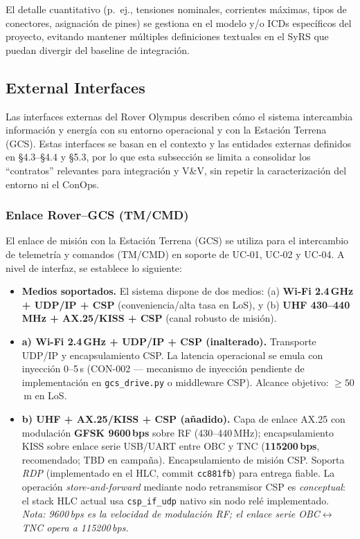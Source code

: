 El detalle cuantitativo (p.\ ej., tensiones nominales, corrientes máximas, tipos de conectores, asignación de pines) se gestiona en el modelo y/o ICDs específicos del proyecto, evitando mantener múltiples definiciones textuales en el SyRS que puedan divergir del baseline de integración.

\subsection{External Interfaces}\label{subsec:external_interfaces}

Las interfaces externas del Rover Olympus describen cómo el sistema intercambia información y energía con su entorno operacional y con la Estación Terrena (GCS). Estas interfaces se basan en el contexto y las entidades externas definidos en §4.3--§4.4 y §5.3, por lo que esta subsección se limita a consolidar los ``contratos'' relevantes para integración y V\&V, sin repetir la caracterización del entorno ni el ConOps.

\subsubsection{Enlace Rover--GCS (TM/CMD)}

El enlace de misión con la Estación Terrena (GCS) se utiliza para el intercambio de telemetría y comandos (TM/CMD) en soporte de UC‑01, UC‑02 y UC‑04. A nivel de interfaz, se establece lo siguiente:

\begin{itemize}
    \item \textbf{Medios soportados.} El sistema dispone de dos medios:
    (a) \textbf{Wi‑Fi 2.4\,GHz + UDP/IP + CSP} (conveniencia/alta tasa en LoS), y
    (b) \textbf{UHF 430–440\,MHz + AX.25/KISS + CSP} (canal robusto de misión).

    \item \textbf{a) Wi-Fi 2.4\,GHz + UDP/IP + CSP (inalterado).}
    Transporte UDP/IP y encapsulamiento CSP. La latencia operacional se emula con
    inyección 0--5\,s (CON-002 --- mecanismo de inyección pendiente de implementación en \texttt{gcs\_drive.py} o middleware CSP). Alcance objetivo: $\ge 50$\,m en LoS.

    \item \textbf{b) UHF + AX.25/\allowbreak KISS + CSP (añadido).}
    Capa de enlace AX.25 con modulación \textbf{GFSK 9600\,bps} sobre RF (430–440\,MHz);
    encapsulamiento KISS sobre enlace serie USB/\allowbreak UART entre OBC y TNC
    (\textbf{115200\,bps}, recomendado; TBD en campaña).
    Encapsulamiento de misión CSP. Soporta \emph{RDP} (implementado en el HLC, commit \texttt{cc881fb}) para entrega fiable.
    La operación \emph{store-and-forward} mediante nodo retransmisor CSP es \emph{conceptual}: el stack HLC actual usa \texttt{csp\_if\_udp} nativo sin nodo relé implementado.
    \emph{Nota: 9600\,bps es la velocidad de modulación RF; el enlace serie
    OBC$\leftrightarrow$TNC opera a 115200\,bps.}
\end{itemize}

